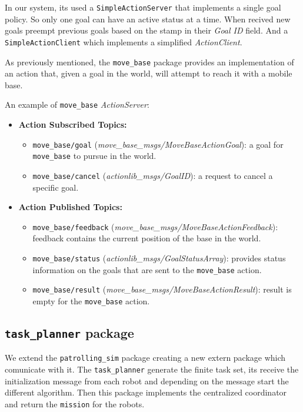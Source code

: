 In our system, its used a \texttt{SimpleActionServer} that implements a single goal policy.
So only one goal can have an active status at a time. When recived new goals preempt previous 
goals based on the stamp in their \textit{Goal ID} field. And a \texttt{SimpleActionClient} which 
implements a simplified \textit{ActionClient}.

As previously mentioned, the \texttt{move\_base} package provides an implementation
of an action that, given a goal in the world, will attempt to reach it with a mobile base.

An example of \texttt{move\_base} \textit{ActionServer}:
\begin{itemize}
    \item {\bf Action Subscribed Topics:}
    \begin{itemize}
        \item \texttt{move\_base/goal} (\textit{move\_base\_msgs/MoveBaseActionGoal}): a goal for \texttt{move\_base} to pursue in the world.
        \item \texttt{move\_base/cancel} (\textit{actionlib\_msgs/GoalID}): a request to cancel a specific goal.
    \end{itemize} 
    \item {\bf Action Published Topics:}
    \begin{itemize}
        \item \texttt{move\_base/feedback} (\textit{move\_base\_msgs/MoveBaseActionFeedback}): feedback contains the current position of the base in the world.
        \item \texttt{move\_base/status} (\textit{actionlib\_msgs/GoalStatusArray}): provides status information on the goals that are sent to the \texttt{move\_base} action.
        \item \texttt{move\_base/result} (\textit{move\_base\_msgs/MoveBaseActionResult}): result is empty for the \texttt{move\_base} action.
    \end{itemize}
\end{itemize}

\subsection{\texttt{task\_planner} package} \label{taskplanner}
We extend the \texttt{patrolling\_sim} package creating a new extern package which 
comunicate with it. 
The \texttt{task\_planner} generate the finite task set, its receive the initialization message 
from each robot and depending on the message start the different algorithm. 
Then this package implements the centralized coordinator and return the \texttt{mission}
for the robots.

